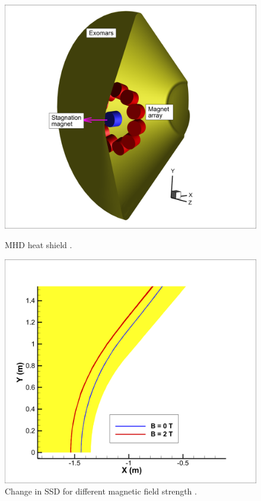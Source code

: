 \documentclass[11pt,sans]{wlscirep} %
\begin{document}
\begin{figure}
  \begin{center}
  \vspace{-15pt}
    \includegraphics[trim={9cm 1cm 13cm 1cm},clip,scale=0.13]{figures/3D_exomars_caseC.png}
  \end{center}
 \caption{MHD heat shield \cite{sharma2024mhd}.} \label{fig:exomars_magnet} \vspace{-12pt}
  \begin{center}
     \includegraphics[trim={2cm 5cm 16cm 5cm},clip,scale=0.12]{figures/ssd_full_magnet_new.png} 
 \caption{Change in SSD for different magnetic field strength \cite{sharma2024mhd}.}
 \label{fig:exomars_ssd}%
 \end{center}
 \vspace{-20pt}
\end{figure}
\end{document}
